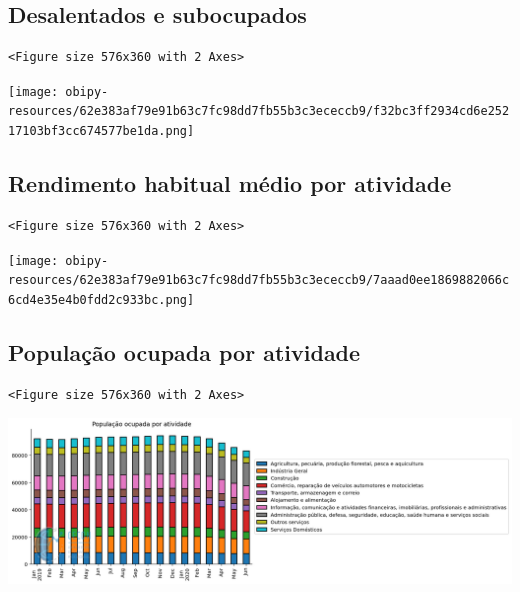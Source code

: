 \documentclass[11pt]{article}
\begin{document}
\subsection{Desalentados e subocupados}
\label{sec:org75317ac}

\begin{verbatim}
<Figure size 576x360 with 2 Axes>
\end{verbatim}


\begin{center}
\texttt{[image: obipy-resources/62e383af79e91b63c7fc98dd7fb55b3c3ececcb9/f32bc3ff2934cd6e25217103bf3cc674577be1da.png]}
\end{center}

\subsection{Rendimento habitual médio por atividade}
\label{sec:org6737333}


\begin{verbatim}
<Figure size 576x360 with 2 Axes>
\end{verbatim}


\begin{center}
\texttt{[image: obipy-resources/62e383af79e91b63c7fc98dd7fb55b3c3ececcb9/7aaad0ee1869882066c6cd4e35e4b0fdd2c933bc.png]}
\end{center}

\subsection{População ocupada por atividade}
\label{sec:org505a7b2}

\begin{verbatim}
<Figure size 576x360 with 2 Axes>
\end{verbatim}


\begin{center}
\includegraphics[width=.9\linewidth]{obipy-resources/62e383af79e91b63c7fc98dd7fb55b3c3ececcb9/18ae86fa0395bd8722bf758ae72aaa47ff7d9d15.png}
\end{center}
\end{document}
